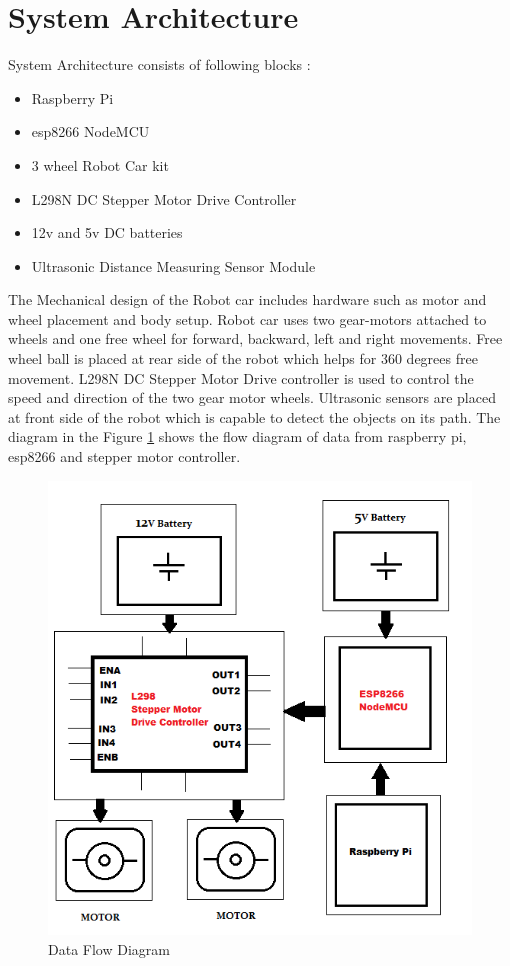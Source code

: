 \documentclass[sigconf]{acmart}
\begin{document}
\section{System Architecture}
System Architecture consists of following blocks :

\begin{itemize}
\item Raspberry Pi
\item esp8266 NodeMCU
\item 3 wheel Robot Car kit
\item L298N DC Stepper Motor Drive Controller
\item 12v and 5v DC batteries
\item Ultrasonic Distance Measuring Sensor Module 
\end{itemize}

The Mechanical design of the Robot car includes hardware such as motor and wheel 
placement and body setup. Robot car uses two gear-motors attached to wheels and 
one free wheel for forward, backward, left and right movements. Free wheel ball 
is placed at rear side of the robot which helps for 360 degrees free movement. 
L298N DC Stepper Motor Drive controller is used to control the speed and direction 
of the two gear motor wheels. Ultrasonic sensors are placed at front side of the 
robot which is capable to detect the objects on its path. The diagram in the 
Figure \ref{F:flow} shows the flow diagram of data from raspberry pi, esp8266 
and stepper motor controller.

\begin{figure}[htb]
      \includegraphics[width=\columnwidth]{images/FlowDiagram.png}
      \caption{Data Flow Diagram}\label{F:flow}
\end{figure}
\end{document}
